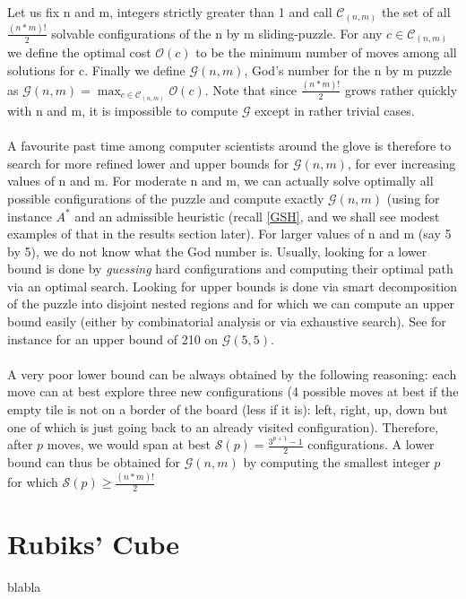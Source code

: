 Let us fix n and m, integers strictly greater than 1 and call $\mathcal{C}_{(n, m)}$ the set of all $\frac{(n * m)!}{2}$ solvable configurations of the n by m sliding-puzzle. For any $c \in \mathcal{C}_{(n, m)}$ we define the optimal cost $\mathcal{O}(c)$ to be the minimum number of moves among all solutions for c. Finally we define $\mathcal{G}(n, m)$, God's number for the n by m puzzle as  $\mathcal{G}(n, m) = \max_{c \in \mathcal{C}_{(n, m)}} \mathcal{O}(c)$. Note that since $\frac{(n * m)!}{2}$ grows rather quickly with n and m, it is impossible to compute $\mathcal{G}$ except in rather trivial cases.
\\
\\
A favourite past time among computer scientists around the glove is therefore to search for more refined lower and upper bounds for $\mathcal{G}(n, m)$, for ever increasing values of n and m. For moderate n and m, we can actually solve optimally all possible configurations of the puzzle and compute exactly $\mathcal{G}(n, m)$  (using for instance $A^{*}$ and an admissible heuristic (recall \ref{GSH}, and we shall see modest examples of that in the results section later). For larger values of n and m (say 5 by 5), we do not know what the God number is. Usually, looking for a lower bound is done by \textit{guessing} hard configurations and computing their optimal path via an optimal search. Looking for upper bounds is done via smart decomposition of the puzzle into disjoint nested regions and for which we can compute an upper bound easily (either by combinatorial analysis or via exhaustive search). See for instance \cite{KarlemoOstergard} for an upper bound of 210 on $\mathcal{G}(5, 5)$.
\\
\\
A very poor lower bound can be always obtained by the following reasoning: each move can at best explore three new configurations (4 possible moves at best if the empty tile is not on a border of the board (less if it is): left, right, up, down but one of which is just going back to an already visited configuration). Therefore, after $p$ moves, we would span at best $\mathcal{S}(p) = \frac{3^{p+1} - 1}{2}$ configurations. A lower bound can thus be obtained for $\mathcal{G}(n, m)$ by computing the smallest integer $p$ for which $\mathcal{S}(p) \ge \frac{(n * m)!}{2}$


\section{Rubiks' Cube}

blabla

